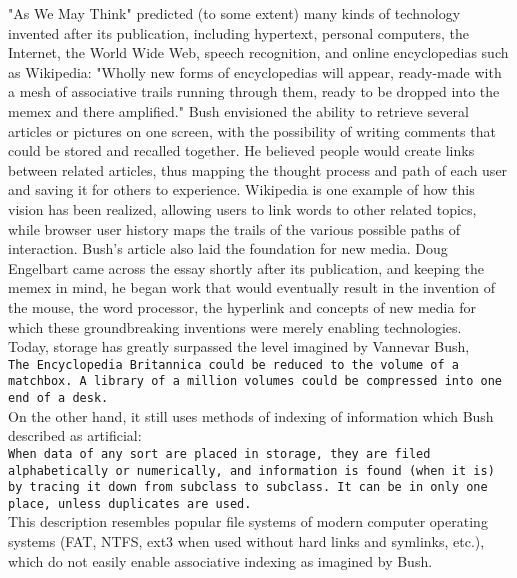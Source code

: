 \documentclass{42-en}
\begin{document}
"As We May Think" predicted (to some extent) many kinds of technology invented after its 
publication, including hypertext, personal computers, the Internet, the World Wide Web, speech 
recognition, and online encyclopedias such as Wikipedia: "Wholly new forms of encyclopedias will 
appear, ready-made with a mesh of associative trails running through them, ready to be dropped 
into the memex and there amplified." Bush envisioned the ability to retrieve several articles or 
pictures on one screen, with the possibility of writing comments that could be stored and recalled
 together. He believed people would create links between related articles, thus mapping the 
 thought process and path of each user and saving it for others to experience. Wikipedia is one 
 example of how this vision has been realized, allowing users to link words to other related 
 topics, while browser user history maps the trails of the various possible paths of interaction.
  Bush's article also laid the foundation for new media. Doug Engelbart came across the essay 
  shortly after its publication, and keeping the memex in mind, he began work that would 
  eventually result in the invention of the mouse, the word processor, the hyperlink and concepts
   of new media for which these groundbreaking inventions were merely enabling technologies.\\

Today, storage has greatly surpassed the level imagined by Vannevar Bush,\\

\texttt{The Encyclopedia Britannica could be reduced to the volume of a matchbox. 
A library of a 
million volumes could be compressed into one end of a desk.}\\

On the other hand, it still uses methods of indexing of information which Bush described as 
artificial:\\

\texttt{When data of any sort are placed in storage, they are filed alphabetically or numerically, 
and information is found (when it is) by tracing it down from subclass to subclass. It can be in 
only one place, unless duplicates are used.}\\

This description resembles popular file systems of modern computer operating systems (FAT, NTFS, 
ext3 when used without hard links and symlinks, etc.), which do not easily enable associative 
indexing as imagined by Bush.\\
\end{document}

